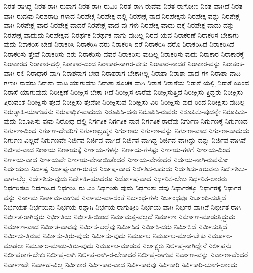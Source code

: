 {ನಿರತ-ರಾಗಿದ್ದ
ನಿರತ-ರಾಗಿ-ರುವಾಗ
ನಿರತ-ರಾಗಿ-ರುವಿರಿ
ನಿರತ-ರಾಗಿ-ರುವೆವು
ನಿರತ-ರಾಗೋಣ
ನಿರತ-ವಾಗಿದೆ
ನಿರತ-ವಾಗಿ-ರುವುವು
ನಿರಪರಾಧಿ-ಗಳಾದ
ನಿರಪೇಕ್ಷ
ನಿರಪೇಕ್ಷ-ದಲ್ಲಿ
ನಿರಪೇಕ್ಷ-ನಾದ
ನಿರಪೇಕ್ಷನು
ನಿರಪೇಕ್ಷ-ವನ್ನು
ನಿರಪೇಕ್ಷ-ವಾಗಿ
ನಿರಪೇಕ್ಷ-ವಾದ
ನಿರಪೇಕ್ಷ-ವಾದರೆ
ನಿರಪೇಕ್ಷ-ವಾದ-ವು-ಗಳು
ನಿರಪೇಕ್ಷ-ವಾದು-ದಕ್ಕೆ
ನಿರಪೇಕ್ಷ-ವಾದು-ದನ್ನು
ನಿರಪೇಕ್ಷ-ವಾದುದು
ನಿರಪೇಕ್ಷವು
ನಿರರ್ಥಕ
ನಿರರ್ಥಕ-ವಾಗು-ವುದಿಲ್ಲ
ನಿರವ-ಯವ
ನಿರಾಕರಣೆ
ನಿರಾಕರಿಸ-ಬೇಕಾಗು-ವುದು
ನಿರಾಕರಿಸ-ಬೇಡ
ನಿರಾಕರಿಸಿ
ನಿರಾಕರಿಸಿ-ದರು
ನಿರಾಕರಿಸಿ-ದರೆ
ನಿರಾಕರಿಸಿ-ದರೊ
ನಿರಾಕರಿಸಿದೆ
ನಿರಾಕರಿಸಿವೆ
ನಿರಾಕರಿಸು-ತ್ತೇವೆ
ನಿರಾಕರಿಸು-ವರು
ನಿರಾಕರಿಸು-ವವರೆ
ನಿರಾಕರಿಸು-ವುದಿಲ್ಲ
ನಿರಾಕರಿಸು-ವುದು
ನಿರಾಕಾರ
ನಿರಾಕಾರಕ್ಕೆ
ನಿರಾಕಾರದ
ನಿರಾಕಾರ-ದಲ್ಲಿ
ನಿರಾಕಾರ-ದಿಂದ
ನಿರಾಕಾರ-ನಾಗಿರ-ಬೇಕು
ನಿರಾಕಾರ-ನಾದರೆ
ನಿರಾಕಾರ-ವನ್ನು
ನಿರಾತಂಕ-ವಾಗಿ-ರಲಿ
ನಿರಾಧಾರ-ವಾಗಿ
ನಿರಾಶನಾಗ-ಬೇಡ
ನಿರಾಶರಾಗ-ಬೇಕಾಗಿಲ್ಲ
ನಿರಾಶಾ
ನಿರಾಶಾ-ವಾದ-ಗಳ
ನಿರಾಶಾ-ವಾದಿ-ಗಳಾಗಿ-ರುವರು
ನಿರಾಶಾ-ವಾದಿ-ಯಾಗುವನು
ನಿರಾಶಾ-ಸೂಚಕ-ವಾಗಿ
ನಿರಾಶೆ
ನಿರಾಶೆಯ
ನಿರಾಶೆ-ಯಲ್ಲಿ
ನಿರಾಶೆ-ಯಿಂದ
ನಿರಾಸೆ-ಯಾಗುವುದು
ನಿರೀಕ್ಷಣೆ
ನಿರೀಕ್ಷಿಸ-ಬೇಕಾ-ಗಿದೆ
ನಿರೀಕ್ಷಿಸ-ಲಾರೆವು
ನಿರೀಕ್ಷಿಸುತ್ತಿದೆ
ನಿರೀಕ್ಷಿಸು-ತ್ತಿದ್ದರು
ನಿರೀಕ್ಷಿಸು-ತ್ತಿರುವಂತೆ
ನಿರೀಕ್ಷಿಸು-ತ್ತೇವೆ
ನಿರೀಕ್ಷಿಸು-ತ್ತೇವೋ
ನಿರೀಕ್ಷಿಸುವ
ನಿರೀಕ್ಷಿಸು-ವಿರಿ
ನಿರೀಕ್ಷಿಸು-ವುದ-ರಿಂದ
ನಿರೀಕ್ಷಿಸು-ವುದಿಲ್ಲ
ನಿರುತ್ಸಾಹಿ-ಯಾಗುವೆನು
ನಿರುಪಾಧಿಕ-ವಾದುದು
ನಿರೂಪಿಸಿ-ದನು
ನಿರೂಪಿಸಿ-ರುವರು
ನಿರೂಪಿಸು-ವುದನ್ನೇ
ನಿರೂಪಿಸು-ವುದು
ನಿರೂಪಿಸು-ವುವು
ನಿರೋಧ-ದಲ್ಲಿ
ನಿರ್ಗತಿಕ
ನಿರ್ಗತಿಕ-ನಾದ
ನಿರ್ಗತಿಕ-ರಾದೆವು
ನಿರ್ಗುಣ
ನಿರ್ಗುಣಕ್ಕೆ
ನಿರ್ಗುಣದ
ನಿರ್ಗುಣ-ದಿಂದ
ನಿರ್ಗುಣ-ದೇವರಿಗೆ
ನಿರ್ಗುಣಬ್ರಹ್ಮನ
ನಿರ್ಗುಣರು
ನಿರ್ಗುಣ-ವನ್ನು
ನಿರ್ಗುಣ-ವಾದ
ನಿರ್ಗುಣ-ವಾದುದು
ನಿರ್ಗುಣ-ವಿಲ್ಲದೆ
ನಿರ್ಗುಣವೇ
ನಿರ್ಜಿವ
ನಿರ್ಜಿವ-ವಾಗಿದೆ
ನಿರ್ಜಿವ-ವಾಗಿದ್ದ
ನಿರ್ಜಿವ-ವಾಗಿದ್ದು-ದನ್ನು
ನಿರ್ಜಿವ-ವಾಗಿವೆ
ನಿರ್ಜಿವ-ವಾದ
ನಿರ್ಣಯ
ನಿರ್ಣಯಕ್ಕೆ
ನಿರ್ಣಯ-ಗಳನ್ನು
ನಿರ್ಣಯ-ಗಳಷ್ಟು
ನಿರ್ಣಯ-ಗಳಿಗೆ
ನಿರ್ಣಯ-ದಿಂದ
ನಿರ್ಣಯ-ವಾದ
ನಿರ್ಣಯವೇ
ನಿರ್ಣಯ-ವೇನಾಯಿತೆಂದರೆ
ನಿರ್ಣಯ-ವೇನೆಂದರೆ
ನಿರ್ದಯ-ನಾಗಿ-ರುವನೋ
ನಿರ್ದಯನು
ನಿರ್ದಿಷ್ಟ
ನಿರ್ದಿಷ್ಟ-ವಾಗಿ-ರುತ್ತದೆ
ನಿರ್ದಿಷ್ಟ-ವಾದ
ನಿರ್ದೆಶಿಸ-ಬಹುದು
ನಿರ್ದೆಶಿಸು-ತ್ತಿರುವನು
ನಿರ್ದೇಶಿಸು-ವಾಗ-ಲೆಲ್ಲ
ನಿರ್ದೇಶಿಸು-ವುದು
ನಿರ್ದೇಹಿ-ಯಾದರೂ
ನಿರ್ದೋಷ-ವಾದ
ನಿರ್ಧರಿಸ-ಬೇಕು
ನಿರ್ಧರಿಸ-ಲಾರರು
ನಿರ್ಧರಿಸಲು
ನಿರ್ಧರಿಸಿದ
ನಿರ್ಧರಿಸಿ-ರು-ವಿರಿ
ನಿರ್ಧರಿಸು-ವುದು
ನಿರ್ಧರಿಸು-ವೆವು
ನಿರ್ಧಾರಕ್ಕೂ
ನಿರ್ಧಾರಕ್ಕೆ
ನಿರ್ಧಾರ-ವನ್ನು
ನಿರ್ನಾಮ
ನಿರ್ನಾಮ-ವಾಗುವ
ನಿರ್ನಾಮ-ವಾ-ದಂತೆ
ನಿರ್ಬಂಧ-ಗಳು
ನಿರ್ಬಂಧವೂ
ನಿರ್ಬಂಧಿ-ಸುತ್ತಿದೆ
ನಿರ್ಭಯತೆ
ನಿರ್ಭಯನು
ನಿರ್ಭಯ-ರನ್ನಾಗಿ
ನಿರ್ಭಯ-ರಾಗುತ್ತೀರಿ
ನಿರ್ಭಯ-ವಾಗಿ
ನಿರ್ಭರ-ವಾಗಿವೆ
ನಿರ್ಭೀತ-ರಾಗಿ
ನಿರ್ಭೀತ-ರಾಗಿದ್ದರು
ನಿರ್ಭೀತಿಯ
ನಿರ್ಭೀತಿ-ಯಿಂದ
ನಿರ್ಮಮತ್ವ-ವಲ್ಲದೆ
ನಿರ್ಮಾಣ
ನಿರ್ಮಾಣ-ಮಾಡುತ್ತಿದ್ದುದು
ನಿರ್ಮಾಣ-ವಾದ
ನಿರ್ಮಿತ-ವಾದವು
ನಿರ್ಮಿಸ-ಬಲ್ಲೆವು
ನಿರ್ಮಿಸಿದ
ನಿರ್ಮಿಸಿ-ದರು
ನಿರ್ಮಿಸಿದೆ
ನಿರ್ಮಿಸುತ್ತಿದೆ
ನಿರ್ಮಿಸು-ತ್ತಿರುವ
ನಿರ್ಮಿಸು-ತ್ತಿರು-ವುದು
ನಿರ್ಮಿಸು-ವುದು
ನಿರ್ಮೂಲ
ನಿರ್ಮೂಲ-ಮಾಡ-ಬೇಕು
ನಿರ್ಮೂಲ-ಮಾಡಲು
ನಿರ್ಮೂಲ-ಮಾಡು-ತ್ತಿರು-ವುದು
ನಿರ್ಮೂಲ-ಮಾಡುವ
ನಿರ್ಲಕ್ಷ್ಯರು
ನಿರ್ಲಿಪ್ತ-ನಾಗಿದ್ದೇನೆ
ನಿರ್ಲಿಪ್ತನು
ನಿರ್ಲಿಪ್ತರಾಗ-ಬೇಕು
ನಿರ್ಲಿಪ್ತ-ರಾಗಿ
ನಿರ್ಲಿಪ್ತ-ರಾಗಿ-ರ-ಬೇಕಾದರೆ
ನಿರ್ಲಿಪ್ತ-ರಾಗುವ
ನಿರ್ವಾಣ-ವನ್ನು
ನಿರ್ವಾಣ-ವೆಂದರೆ
ನಿರ್ವಾಣವೇ
ನಿರ್ವಾಹ-ವಿಲ್ಲ
ನಿರ್ವಿಕಾರ
ನಿರ್ವಿ-ಕಾರ-ವಾದ
ನಿರ್ವಿ-ಕಾರವು
ನಿರ್ವಿಕಾರಿ
ನಿರ್ವಿಕಾರಿ-ಯಾಗ-ಲಾರದು
}
